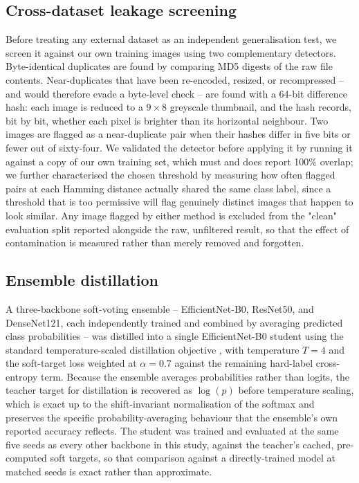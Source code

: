 \documentclass[conference]{IEEEtran}
\begin{document}
\subsection{Cross-dataset leakage screening}
Before treating any external dataset as an independent generalisation test, we screen it against our own training images using two complementary detectors. Byte-identical duplicates are found by comparing MD5 digests of the raw file contents. Near-duplicates that have been re-encoded, resized, or recompressed -- and would therefore evade a byte-level check -- are found with a 64-bit difference hash: each image is reduced to a $9\times8$ greyscale thumbnail, and the hash records, bit by bit, whether each pixel is brighter than its horizontal neighbour. Two images are flagged as a near-duplicate pair when their hashes differ in five bits or fewer out of sixty-four. We validated the detector before applying it by running it against a copy of our own training set, which must and does report 100\% overlap; we further characterised the chosen threshold by measuring how often flagged pairs at each Hamming distance actually shared the same class label, since a threshold that is too permissive will flag genuinely distinct images that happen to look similar. Any image flagged by either method is excluded from the "clean" evaluation split reported alongside the raw, unfiltered result, so that the effect of contamination is measured rather than merely removed and forgotten.

\subsection{Ensemble distillation}
A three-backbone soft-voting ensemble -- EfficientNet-B0, ResNet50, and DenseNet121, each independently trained and combined by averaging predicted class probabilities -- was distilled into a single EfficientNet-B0 student using the standard temperature-scaled distillation objective \cite{hinton2015}, with temperature $T=4$ and the soft-target loss weighted at $\alpha=0.7$ against the remaining hard-label cross-entropy term. Because the ensemble averages probabilities rather than logits, the teacher target for distillation is recovered as $\log(p)$ before temperature scaling, which is exact up to the shift-invariant normalisation of the softmax and preserves the specific probability-averaging behaviour that the ensemble's own reported accuracy reflects. The student was trained and evaluated at the same five seeds as every other backbone in this study, against the teacher's cached, pre-computed soft targets, so that comparison against a directly-trained model at matched seeds is exact rather than approximate.
\end{document}
